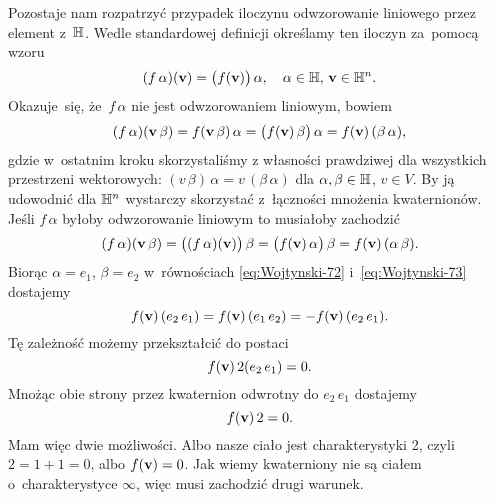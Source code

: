 \documentclass[a4paper,11pt]{article}
\begin{document}
Pozostaje nam rozpatrzyć przypadek iloczynu odwzorowanie liniowego przez element z~$\mathbb{H}$. Wedle standardowej definicji określamy ten iloczyn za~pomocą wzoru
\begin{equation}
  \label{eq:Wojtynski-71}
  ( f \, \alpha )( \mathbf{v} ) = \big( f( \mathbf{v} ) \big) \, \alpha, \quad
  \alpha \in \mathbb{H}, \, \mathbf{v} \in \mathbb{H}^{ n }.
\end{equation}
Okazuje~się, że~$f \, \alpha$ nie jest odwzorowaniem liniowym, bowiem
\begin{equation}
  \label{eq:Wojtynski-72}
  ( f \, \alpha )( \mathbf{v} \, \beta ) = f( \mathbf{v} \, \beta ) \, \alpha =
  \big( f( \mathbf{v} ) \, \beta \big) \, \alpha =
  f( \mathbf{v} ) \, ( \beta \, \alpha ),
\end{equation}
gdzie w~ostatnim kroku skorzystaliśmy z własności prawdziwej dla
wszystkich przestrzeni wektorowych:
$( v \, \beta ) \, \alpha = v \, ( \beta \, \alpha )$ dla $\alpha, \beta \in \mathbb{H}$, $v \in V$. By ją
udowodnić dla $\mathbb{H}^{ n }$ wystarczy skorzystać z~łączności mnożenia
kwaternionów. Jeśli $f \, \alpha$ byłoby odwzorowanie liniowym to musiałoby zachodzić
\begin{equation}
  \label{eq:Wojtynski-73}
  ( f \, \alpha )( \mathbf{v} \, \beta ) =
  \big( ( f \, \alpha )( \mathbf{v} ) \big) \, \beta =
  \big( f( \mathbf{v} ) \, \alpha \big) \, \beta =
  f( \mathbf{v} ) \, ( \alpha \, \beta ).
\end{equation}
Biorąc $\alpha = e_{ 1 }$, $\beta = e_{ 2 }$ w~równościach \eqref{eq:Wojtynski-72}
i~\eqref{eq:Wojtynski-73} dostajemy
\begin{equation}
  \label{eq:Wojtynski-74}
  f( \mathbf{v} ) \, ( e_{ 2 } \, e_{ 1 } ) =
  f( \mathbf{v} ) \, ( e_{ 1 } \, e_{ 2 } ) =
  -f( \mathbf{v} ) \, ( e_{ 2 } \, e_{ 1 } ).
\end{equation}
Tę zależność możemy przekształcić do postaci
\begin{equation}
  \label{eq:Wojtynski-75}
  f( \mathbf{v} ) \, 2 ( e_{ 2 } \, e_{ 1 } ) = 0.
\end{equation}
Mnożąc obie strony przez kwaternion odwrotny do $e_{ 2 } \, e_{ 1 }$
dostajemy
\begin{equation}
  \label{eq:Wojtynski-76}
  f( \mathbf{v} ) \, 2 = 0.
\end{equation}
Mam więc dwie możliwości. Albo nasze ciało jest charakterystyki 2,
czyli~$2 = 1 + 1 = 0$, albo $f( \mathbf{v} ) = 0$. Jak wiemy kwaterniony nie
są ciałem o~charakterystyce $\infty$, więc musi zachodzić drugi warunek.
\end{document}
